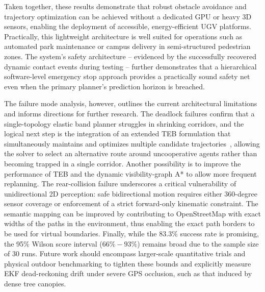 Taken together, these results demonstrate that robust obstacle avoidance and trajectory optimization can be achieved without a dedicated GPU or heavy 3D sensors, enabling the deployment of accessible, energy-efficient UGV platforms. Practically, this lightweight architecture is well suited for operations such as automated park maintenance or campus delivery in semi-structured pedestrian zones. The system's safety architecture -- evidenced by the successfully recovered dynamic contact events during testing -- further demonstrates that a hierarchical software-level emergency stop approach provides a practically sound safety net even when the primary planner's prediction horizon is breached.

The failure mode analysis, however, outlines the current architectural limitations and informs directions for further research. The deadlock failures confirm that a single-topology elastic band planner struggles in shrinking corridors, and the logical next step is the integration of an extended TEB formulation that simultaneously maintains and optimizes multiple candidate trajectories~\cite{rossman2017teb}, allowing the solver to select an alternative route around uncooperative agents rather than becoming trapped in a single corridor. Another possibility is to improve the performance of TEB and the dynamic visibility-graph A* to allow more frequent replanning. The rear-collision failure underscores a critical vulnerability of unidirectional 2D perception: safe bidirectional motion requires either 360-degree sensor coverage or enforcement of a strict forward-only kinematic constraint. The semantic mapping can be improved by contributing to OpenStreetMap with exact widths of the paths in the environment, thus enabling the exact path borders to be used for virtual boundaries. Finally, while the $83.3\%$ success rate is promising, the 95\% Wilson score interval ($66\%-93\%$) remains broad due to the sample size of 30 runs. Future work should encompass larger-scale quantitative trials and physical outdoor benchmarking to tighten these bounds and explicitly measure EKF dead-reckoning drift under severe GPS occlusion, such as that induced by dense tree canopies.
